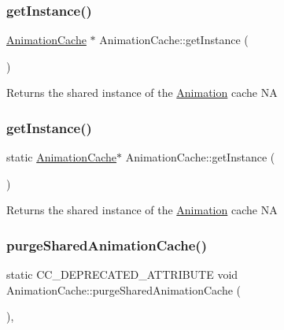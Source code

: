\subsubsection{\texorpdfstring{get\+Instance()}{getInstance()}\hspace{0.1cm}{\footnotesize\ttfamily [1/2]}}
{\footnotesize\ttfamily \hyperlink{classAnimationCache}{Animation\+Cache} $\ast$ Animation\+Cache\+::get\+Instance (\begin{DoxyParamCaption}{ }\end{DoxyParamCaption})\hspace{0.3cm}{\ttfamily [static]}}

Returns the shared instance of the \hyperlink{classAnimation}{Animation} cache  NA \mbox{\label{classAnimationCache_a5b76a593eee51827cec2915ce870c7cf}} 
\subsubsection{\texorpdfstring{get\+Instance()}{getInstance()}\hspace{0.1cm}{\footnotesize\ttfamily [2/2]}}
{\footnotesize\ttfamily static \hyperlink{classAnimationCache}{Animation\+Cache}$\ast$ Animation\+Cache\+::get\+Instance (\begin{DoxyParamCaption}{ }\end{DoxyParamCaption})\hspace{0.3cm}{\ttfamily [static]}}

Returns the shared instance of the \hyperlink{classAnimation}{Animation} cache  NA \mbox{\label{classAnimationCache_ad9863fb791f64c88908c5b6e3a8ce745}} 
\subsubsection{\texorpdfstring{purge\+Shared\+Animation\+Cache()}{purgeSharedAnimationCache()}\hspace{0.1cm}{\footnotesize\ttfamily [1/2]}}
{\footnotesize\ttfamily static C\+C\+\_\+\+D\+E\+P\+R\+E\+C\+A\+T\+E\+D\+\_\+\+A\+T\+T\+R\+I\+B\+U\+TE void Animation\+Cache\+::purge\+Shared\+Animation\+Cache (\begin{DoxyParamCaption}{ }\end{DoxyParamCaption})\hspace{0.3cm}{\ttfamily [inline]}, {\ttfamily [static]}}

